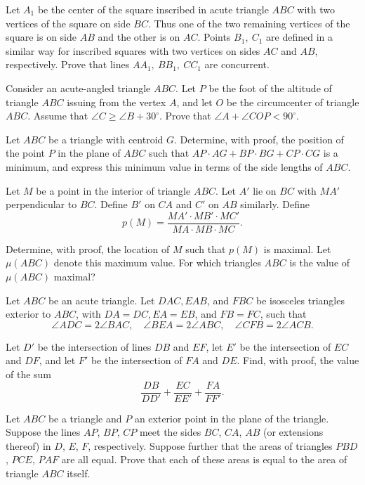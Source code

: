 \item[\textbf{G1.}]Let $A_1$ be the center of the square inscribed in acute triangle $ABC$ with two vertices of the square on side $BC$.  Thus one of the two remaining vertices of the square is on side $AB$ and the other is on $AC$. Points $B_1,\ C_1$ are defined in a similar way for inscribed squares with two vertices on sides $AC$ and $AB$,  respectively. Prove that lines $AA_1,\ BB_1,\ CC_1$ are concurrent.

\item[\textbf{G2.}]Consider an acute-angled triangle $ABC$. Let $P$ be the foot of the altitude of triangle $ABC$ issuing from the vertex $A$,  and let $O$ be the circumcenter of triangle $ABC$. Assume that $\angle C \geq \angle B+30^{\circ}$. Prove that $\angle A+\angle COP < 90^{\circ}$.

\item[\textbf{G3.}]Let $ABC$ be a triangle with centroid $G$. Determine, with proof, the position of the point $P$ in the plane of $ABC$ such that $AP{\cdot}AG + BP{\cdot}BG + CP{\cdot}CG$ is a minimum, and express this minimum value in terms of the side lengths of $ABC$.

\item[\textbf{G4.}]Let $M$ be a point in the interior of triangle $ABC$. Let $A'$ lie on $BC$ with $MA'$ perpendicular to $BC$. Define $B'$ on $CA$ and $C'$ on $AB$ similarly.  Define\[
p(M) = \frac{MA' \cdot MB' \cdot MC'}{MA \cdot MB \cdot MC}.
\]

Determine, with proof, the location of $M$ such that $p(M)$ is maximal.  Let $\mu(ABC)$ denote this maximum value.  For which triangles $ABC$ is the value of $\mu(ABC)$ maximal?

\item[\textbf{G5.}]Let $ABC$ be an acute triangle.  Let $DAC,EAB$,  and $FBC$ be isosceles triangles exterior to $ABC$,  with $DA=DC, EA=EB$,  and $FB=FC$,  such that\[
\angle ADC = 2\angle BAC, \quad \angle BEA= 2 \angle ABC, \quad
\angle CFB = 2 \angle ACB.
\]

Let $D'$  be the intersection of lines $DB$ and $EF$,  let $E'$ be the intersection of $EC$ and $DF$,  and let $F'$   be the intersection of $FA$ and $DE$. Find, with proof, the value of the sum\[
\frac{DB}{DD'}+\frac{EC}{EE'}+\frac{FA}{FF'}.
\]

\item[\textbf{G6.}]Let $ABC$ be a triangle and $P$ an exterior point in the plane of the triangle. Suppose the lines $AP$,  $BP$,  $CP$ meet the sides $BC$,  $CA$,  $AB$ (or extensions thereof) in $D$,  $E$,  $F$,  respectively. Suppose further that the areas of triangles $PBD$,  $PCE$,  $PAF$ are all equal. Prove that each of these areas is equal to the area of triangle $ABC$ itself.

